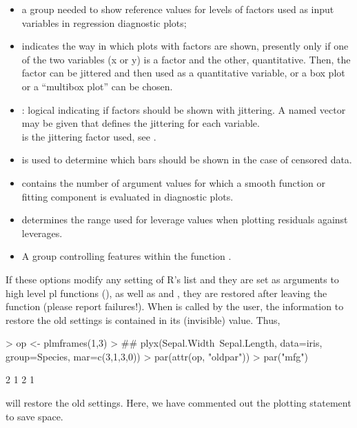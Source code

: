 \documentclass[11pt]{article}
\begin{document}
\begin{itemize}
\item
  a group  needed to show reference values for levels of factors
  used as input variables in regression diagnostic plots;
\item
   indicates the way in which plots with factors are shown,
  presently only if one of the two variables (x or y) is a factor and the
  other, quantitative. Then, the factor can be jittered and then used
  as a quantitative variable, or a box plot or a ``multibox plot'' can be 
  chosen.
\item
  : logical indicating if factors should be shown with jittering.
  A named vector may be given that defines the jittering for each
  variable.\\ 
   is the jittering factor used, see .
\item
   is used to determine which bars should be shown
  in the case of censored data.
\item
   contains the number of argument values for which 
  a smooth function or fitting component is evaluated in diagnostic plots.
\item
   determines the range used for leverage values
  when plotting residuals against leverages.
\item
  A group  controlling features within the function .
\end{itemize}

If these options modify any setting of R's  list and they are 
set as arguments to high level pl functions 
(), as well as 
 and ,
they are restored after leaving the function (please report failures!).
When  is called by the user, the information to restore 
the old settings is contained in its (invisible) value.
Thus, 
\begin{Schunk}
\begin{Sinput}
> op <- plmframes(1,3)
> ## plyx(Sepal.Width~Sepal.Length, data=iris, group=Species, mar=c(3,1,3,0))
> par(attr(op, "oldpar"))
> par("mfg")
\end{Sinput}
\begin{Soutput}
[1] 2 1 2 1
\end{Soutput}
\end{Schunk}
will restore the old settings. Here, we have commented out the plotting
statement to save space.
\end{document}
